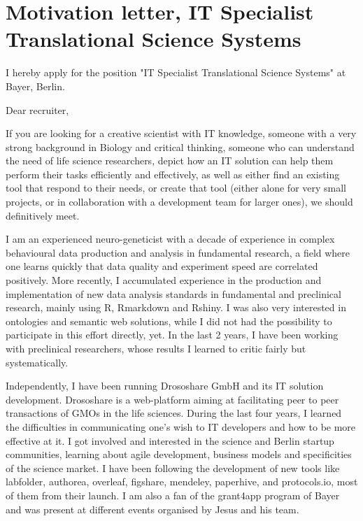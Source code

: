 \section* {Motivation letter, IT Specialist Translational Science
Systems}

I hereby apply for the position "IT Specialist Translational Science
Systems" at Bayer, Berlin.
\vspace {0.5cm} 

Dear recruiter,

If you are looking for a creative scientist with IT knowledge, someone with a very strong background in Biology and critical thinking, someone who can understand the need of life science researchers, depict how an IT solution can help them perform their tasks efficiently and effectively, as well as either find an existing tool that respond to their needs, or create that tool (either alone for very small projects, or in collaboration with a development team for larger ones), we should definitively meet.

I am an experienced neuro-geneticist with a decade of experience in complex behavioural data production and analysis in fundamental research, a field where one learns quickly that data quality and experiment speed are correlated positively.
More recently, I accumulated experience in the production and implementation of new data analysis standards in fundamental and preclinical research, mainly using R, Rmarkdown and Rshiny. I was also very interested in ontologies and semantic web solutions, while I did not had the possibility to participate in this effort directly, yet. In the last 2 years, I have been working with preclinical researchers, whose results I learned to critic fairly but systematically.

Independently, I have been running Drososhare GmbH and its IT solution development. Drososhare is a web-platform aiming at facilitating peer to peer transactions of GMOs in the life sciences. During the last four years, I learned the difficulties in communicating one's wish to IT developers and how to be more effective at it. I got involved and interested in the science and Berlin startup communities, learning about agile development, business models and specificities of the science market. I have been following the development of new tools like labfolder, authorea, overleaf, figshare, mendeley, paperhive, and protocols.io, most of them from their launch. I am also a fan of the grant4app program of Bayer and was present at different events organised by Jesus and his team.

